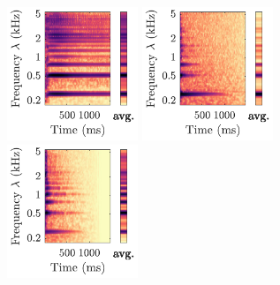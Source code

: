 \documentclass{bmcart}
\begin{document}
\begin{backmatter}
\begin{figure}
\hspace{18mm}
\hspace{24mm}
\hspace{8mm}
\vspace{1cm}


\includegraphics[height=4cm]{Vn-sfz-C4-fp-4c_scalogram.pdf}
\hspace{8mm}
\includegraphics[trim=35 0 0 0, clip, height=4cm]{Vn-pizz-lv-C4-pp-4c_scalogram.pdf}
\hspace{12mm}
\includegraphics[trim=35 0 0 0, clip, height=4cm]{Vn-stacc-C4-mf_scalogram.pdf}



\end{figure}
\end{backmatter}
\end{document}
